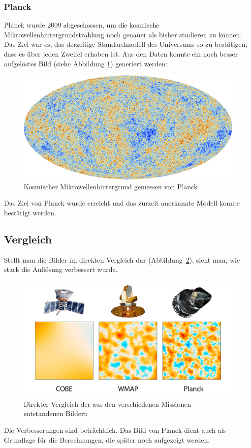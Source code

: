 \subsubsection{Planck}
Planck wurde 2009 abgeschossen, um die kosmische 
Mikrowellenhintergrundstrahlung noch genauer als bisher studieren zu können.
Das Ziel war es, das derzeitige Standardmodell des Universums so zu bestätigen, 
dass es über jeden Zweifel erhaben ist.
Aus den Daten konnte ein noch besser aufgelöstes Bild (siehe Abbildung \ref{fig:CMB_Planck}) generiert werden:
\begin{figure}
	\includegraphics[width=\linewidth]{cmb/images/CMB_Planck.jpg}
	\caption{Kosmischer Mikrowellenhintergrund gemessen von Planck}
	\label{fig:CMB_Planck}
\end{figure}
Das Ziel von Planck wurde erreicht und das zurzeit anerkannte Modell konnte 
bestätigt werden.

\subsection{Vergleich}
Stellt man die Bilder im direkten Vergleich dar 
(Abbildung~\ref{fig:COBE_WMAP_PLANCK}), sieht man, wie stark die Auflösung 
verbessert wurde.
\begin{figure}
	\includegraphics[width=\linewidth]{cmb/images/COBE_WMAP_Planck.jpg}
	\caption{Direkter Vergleich der aus den verschiedenen Missionen 
	entstandenen Bildern}
	\label{fig:COBE_WMAP_PLANCK}
\end{figure}
Die Verbesserungen sind beträchtlich.
Das Bild von Planck dient auch als Grundlage für die Berechnungen, die später 
noch aufgezeigt werden.
